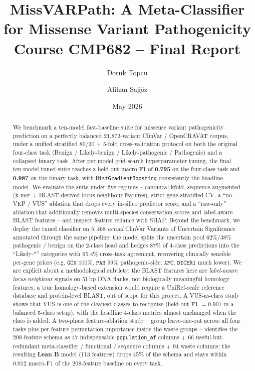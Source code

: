 \documentclass[11pt,a4paper]{article}
\title{\textbf{MissVARPath:} A Meta-Classifier for Missense Variant Pathogenicity\\
\large Course CMP682 -- Final Report}
\author{Doruk Topcu \and Alihan Sa\u{g}\"{o}z}
\date{May 2026}
\begin{document}
\maketitle

\begin{abstract}
We benchmark a ten-model fast-baseline suite for missense variant pathogenicity
prediction on a perfectly balanced 21{,}872-variant ClinVar / OpenCRAVAT corpus,
under a unified stratified 80/20 + 5-fold cross-validation protocol on both the
original four-class task (Benign / Likely-benign / Likely-pathogenic / Pathogenic)
and a collapsed binary task. After per-model grid-search hyperparameter tuning, the final ten-model tuned suite reaches
a held-out macro-F1 of \textbf{0.795} on the four-class task and \textbf{0.987}
on the binary task, with \texttt{HistGradientBoosting} consistently the headline
model. We evaluate the suite under five regimes -- canonical kfold, sequence-augmented
(k-mer + BLAST-derived locus-neighbour features), strict gene-stratified CV, a
``no-VEP / VUS'' ablation that drops every in-silico predictor score, and a
``raw-only'' ablation that additionally removes multi-species conservation scores
and label-aware BLAST features -- and inspect feature reliance with SHAP. Beyond
the benchmark, we deploy the tuned classifier on $5{,}468$ \emph{actual} ClinVar
Variants of Uncertain Significance annotated through the same pipeline; the model splits the uncertain pool $62\% / 38\%$
pathogenic / benign on the 2-class head and hedges $87\%$ of 4-class predictions
into the ``Likely-*'' categories with $95.4\%$ cross-task agreement, recovering
clinically sensible per-gene priors (e.g. $\texttt{GCK}$ $100\%$, $\texttt{PAH}$
$99\%$ pathogenic-side; $\texttt{APC}$, $\texttt{DICER1}$ much lower). We are
explicit about a methodological subtlety: the BLAST features here are
\emph{label-aware locus-neighbour} signals on 51\,bp DNA flanks, not biologically
meaningful homology features; a true homology-based
extension would require a UniRef-scale reference database and protein-level BLAST,
out of scope for this project. A VUS-as-class study shows
that VUS is one of the cleanest classes to recognise (held-out F1 $=0.901$ in a
balanced 5-class setup), with the headline 4-class metrics almost unchanged
when the class is added. A two-phase feature-ablation study -- group leave-one-out across all four tasks plus
per-feature permutation importance inside the waste groups -- identifies the
$208$-feature schema as $47$ indispensable \texttt{population\_af} columns
$+$ $66$ useful-but-redundant meta-classifier / functional / sequence columns
$+$ $94$ waste columns; the resulting \textbf{Lean B} model (113 features) drops $45\%$ of the schema and stays within $0.012$ macro-F1
of the $208$-feature baseline on every task.
\end{abstract}
\end{document}
